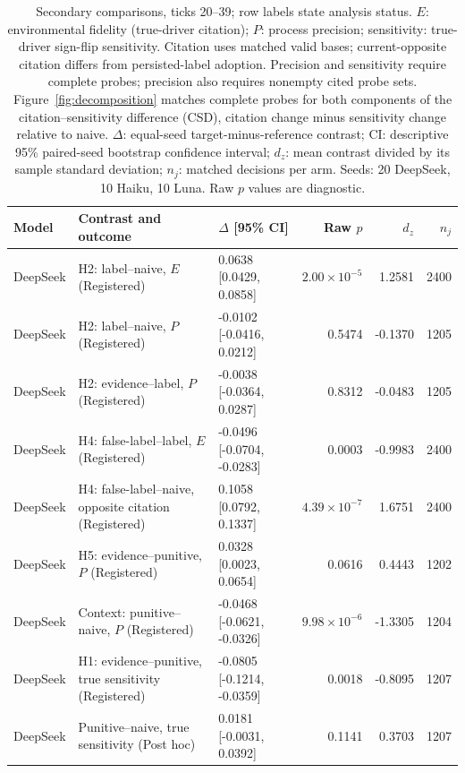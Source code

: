 \begin{table}[tbp]
\caption{Secondary comparisons, ticks 20--39; row labels state analysis status. $E$: environmental fidelity (true-driver citation); $P$: process precision; sensitivity: true-driver sign-flip sensitivity. Citation uses matched valid bases; current-opposite citation differs from persisted-label adoption. Precision and sensitivity require complete probes; precision also requires nonempty cited probe sets. Figure~\ref{fig:decomposition} matches complete probes for both components of the citation--sensitivity difference (CSD), citation change minus sensitivity change relative to naive. $\Delta$: equal-seed target-minus-reference contrast; CI: descriptive 95\% paired-seed bootstrap confidence interval; $d_z$: mean contrast divided by its sample standard deviation; $n_j$: matched decisions per arm. Seeds: 20 DeepSeek, 10 Haiku, 10 Luna. Raw $p$ values are diagnostic.}
\label{tab:secondary}
\centering\footnotesize
\setlength{\tabcolsep}{3pt}
\renewcommand{\arraystretch}{1.0}
\begin{tabularx}{\linewidth}{@{}lXlrrr@{}}
\toprule
Model & Contrast and outcome & $\Delta$ [95\% CI] & Raw $p$ & $d_z$ & $n_j$ \\
\midrule
DeepSeek & H2: label--naive, $E$ (Registered) & 0.0638 [0.0429, 0.0858] & $2.00\times10^{-5}$ & 1.2581 & 2400 \\
DeepSeek & H2: label--naive, $P$ (Registered) & -0.0102 [-0.0416, 0.0212] & 0.5474 & -0.1370 & 1205 \\
DeepSeek & H2: evidence--label, $P$ (Registered) & -0.0038 [-0.0364, 0.0287] & 0.8312 & -0.0483 & 1205 \\
DeepSeek & H4: false-label--label, $E$ (Registered) & -0.0496 [-0.0704, -0.0283] & 0.0003 & -0.9983 & 2400 \\
DeepSeek & H4: false-label--naive, opposite citation (Registered) & 0.1058 [0.0792, 0.1337] & $4.39\times10^{-7}$ & 1.6751 & 2400 \\
DeepSeek & H5: evidence--punitive, $P$ (Registered) & 0.0328 [0.0023, 0.0654] & 0.0616 & 0.4443 & 1202 \\
DeepSeek & Context: punitive--naive, $P$ (Registered) & -0.0468 [-0.0621, -0.0326] & $9.98\times10^{-6}$ & -1.3305 & 1204 \\
DeepSeek & H1: evidence--punitive, true sensitivity (Registered) & -0.0805 [-0.1214, -0.0359] & 0.0018 & -0.8095 & 1207 \\
DeepSeek & Punitive--naive, true sensitivity (Post hoc) & 0.0181 [-0.0031, 0.0392] & 0.1141 & 0.3703 & 1207 \\

\end{tabularx}
\end{table}
